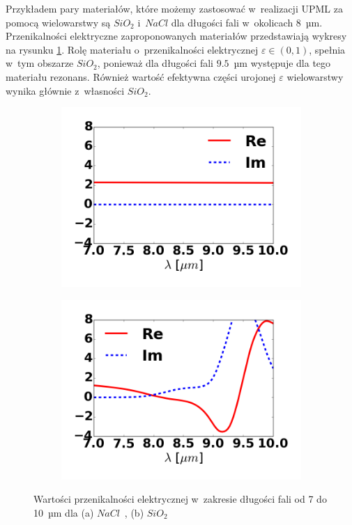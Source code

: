 Przykładem pary materiałów, które możemy zastosować w~realizacji UPML za pomocą wielowarstwy są $SiO_2$ i~$NaCl$ dla długości fali w~okolicach 8~µm. Przenikalności elektryczne zaproponowanych materiałów przedstawiają wykresy na rysunku \ref{fig:nacl-sio2-mat}. Rolę materiału o~przenikalności elektrycznej $\varepsilon \in (0,1)$, spełnia w~tym obszarze $SiO_2$, ponieważ dla długości fali $9.5$~µm występuje dla tego materiału rezonans. Również wartość efektywna części urojonej $\varepsilon$ wielowarstwy wynika głównie z~własności $SiO_2$. 

\begin{figure}[tb]
	\begin{subfigure}{0.45\textwidth}
		\includegraphics[width=\textwidth]{images/pml/nacl.png}
		\caption{}
	\end{subfigure}
	\begin{subfigure}{0.45\textwidth}
		\includegraphics[width=\textwidth]{images/pml/sio2.png}	
		\caption{}
	\end{subfigure}
	\caption{Wartości przenikalności elektrycznej w~zakresie długości fali od 7 do 10~µm dla (a) $NaCl$~\cite{li1976refractive}, (b) $SiO_2$~\cite{Kischkat:12}}
	\label{fig:nacl-sio2-mat}
\end{figure}

